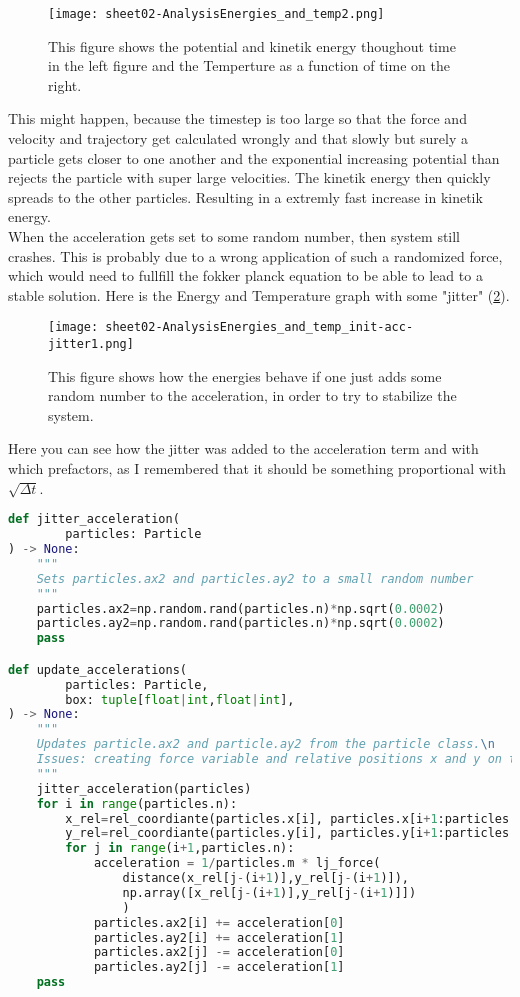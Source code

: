 \documentclass{article}
\begin{document}
\begin{figure}[h]
    \texttt{[image: sheet02-AnalysisEnergies\_and\_temp2.png]} 
    \caption{This figure shows the potential and kinetik energy thoughout time in the left figure and the Temperture as a function of time on the right.}\label{simcrash}
\end{figure}

This might happen, because the timestep is too large so that the force and velocity and trajectory get calculated wrongly and that slowly but surely a particle gets closer to one another and the exponential increasing potential than rejects the particle with super large velocities. The kinetik energy then quickly spreads to the other particles. Resulting in a extremly fast increase in kinetik energy.\\

When the acceleration gets set to some random number, then system still crashes. This is probably due to a wrong application of such a randomized force, which would need to fullfill the fokker planck equation to be able to lead to a stable solution. Here is the Energy and Temperature graph with some "jitter" (\ref{energy-with-jitter}).

\begin{figure}
    \texttt{[image: sheet02-AnalysisEnergies\_and\_temp\_init-acc-jitter1.png]}
    \caption{This figure shows how the energies behave if one just adds some random number to the acceleration, in order to try to stabilize the system.}\label{energy-with-jitter}
\end{figure}

Here you can see how the jitter was added to the acceleration term and with which prefactors, as I remembered that it should be something proportional with $\sqrt{\Delta t}$.
\begin{lstlisting}[language=Python, caption=Energy Plotting]
def jitter_acceleration(
        particles: Particle
) -> None:
    """
    Sets particles.ax2 and particles.ay2 to a small random number 
    """
    particles.ax2=np.random.rand(particles.n)*np.sqrt(0.0002)
    particles.ay2=np.random.rand(particles.n)*np.sqrt(0.0002)
    pass

def update_accelerations(
        particles: Particle,
        box: tuple[float|int,float|int],    
) -> None:
    """
    Updates particle.ax2 and particle.ay2 from the particle class.\n
    Issues: creating force variable and relative positions x and y on the fly.
    """
    jitter_acceleration(particles)
    for i in range(particles.n):
        x_rel=rel_coordiante(particles.x[i], particles.x[i+1:particles.n],box[0]) 
        y_rel=rel_coordiante(particles.y[i], particles.y[i+1:particles.n],box[1])
        for j in range(i+1,particles.n):
            acceleration = 1/particles.m * lj_force(
                distance(x_rel[j-(i+1)],y_rel[j-(i+1)]),
                np.array([x_rel[j-(i+1)],y_rel[j-(i+1)]])
                ) 
            particles.ax2[i] += acceleration[0]  
            particles.ay2[i] += acceleration[1]
            particles.ax2[j] -= acceleration[0] 
            particles.ay2[j] -= acceleration[1]
    pass
\end{lstlisting}
\end{document}
